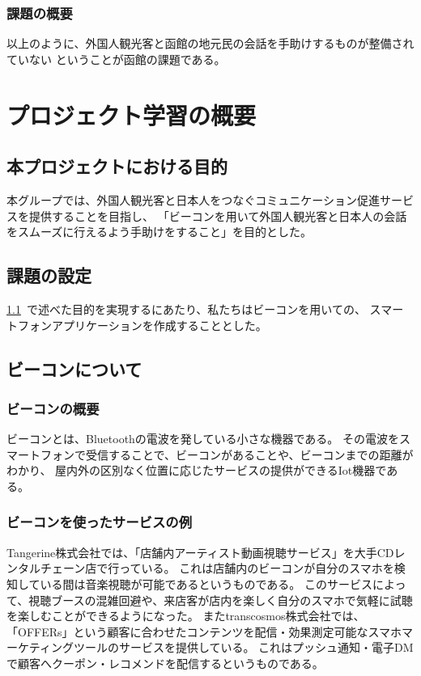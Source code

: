 \documentclass[openany,11pt,papersize]{jsbook}
\begin{document}
\subsection{課題の概要}
 以上のように、外国人観光客と函館の地元民の会話を手助けするものが整備されていない
ということが函館の課題である。



\chapter{プロジェクト学習の概要}

\section{本プロジェクトにおける目的}\label{sec:mokuteki}
 本グループでは、外国人観光客と日本人をつなぐコミュニケーション促進サービスを提供することを目指し、
「ビーコンを用いて外国人観光客と日本人の会話をスムーズに行えるよう手助けをすること」を目的とした。

\section{課題の設定}
\ref{sec:mokuteki}~で述べた目的を実現するにあたり、私たちはビーコンを用いての、
スマートフォンアプリケーションを作成することとした。

\section{ビーコンについて}
\subsection{ビーコンの概要}
 ビーコンとは、Bluetoothの電波を発している小さな機器である。
その電波をスマートフォンで受信することで、ビーコンがあることや、ビーコンまでの距離がわかり、
屋内外の区別なく位置に応じたサービスの提供ができるIot機器である。

\subsection{ビーコンを使ったサービスの例}
 Tangerine株式会社では、「店舗内アーティスト動画視聴サービス」を大手CDレンタルチェーン店で行っている。
これは店舗内のビーコンが自分のスマホを検知している間は音楽視聴が可能であるというものである。
このサービスによって、視聴ブースの混雑回避や、来店客が店内を楽しく自分のスマホで気軽に試聴を楽しむことができるようになった。
またtranscosmos株式会社では、「OFFERs」という顧客に合わせたコンテンツを配信・効果測定可能なスマホマーケティングツールのサービスを提供している。
これはプッシュ通知・電子DMで顧客へクーポン・レコメンドを配信するというものである。
\end{document}
